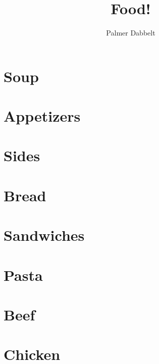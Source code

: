 \documentclass{book}
\author{Palmer Dabbelt}
\title{Food!}
\begin{document}
\maketitle
\tableofcontents
\contentsskip

\newcommand{\maketitle}{}
\renewcommand{\tableofcontents}{}
\newcommand{\author}[1]{}
\newcommand{\title}[1]{}
\renewcommand{\contentsskip}{}
\renewcommand{\bref}[1]{\ref{#1}}

\chapter{Soup}



\chapter{Appetizers}


\chapter{Sides}


\chapter{Bread}



\chapter{Sandwiches}



\chapter{Pasta}



\chapter{Beef}


\chapter{Chicken}



\end{document}
